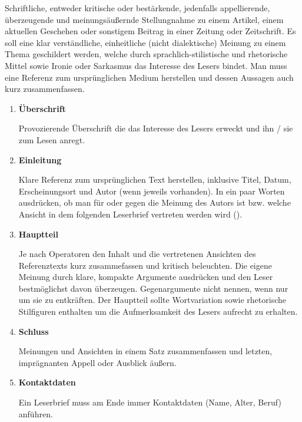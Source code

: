 



\thispagestyle{plain}




Schriftliche, entweder kritische oder best\"{a}rkende, jedenfalls appellierende, \"{u}berzeugende und meinungs\"{a}u\ss{}ernde Stellungnahme zu einem Artikel, einem aktuellen Geschehen oder sonstigem Beitrag in einer Zeitung oder Zeitschrift. Es soll eine klar verst\"{a}ndliche, einheitliche (nicht dialektische) Meinung zu einem Thema geschildert werden, welche durch sprachlich-stilistische und rhetorische Mittel sowie Ironie oder Sarkasmus das Interesse des Lesers bindet. Man muss eine Referenz zum urspr\"{u}nglichen Medium herstellen und dessen Aussagen auch kurz zusammenfassen.


\begin{enumerate}
  \item \textbf{\"{U}berschrift}
  \par
        Provozierende \"{U}berschrift die das Interesse des Lesers erweckt und ihn / sie zum Lesen anregt.

  \item \textbf{Einleitung}
  \par
  Klare Referenz zum urspr\"{u}nglichen Text herstellen, inklusive Titel, Datum, Erscheinungsort und Autor (wenn jeweils vorhanden). In ein paar Worten ausdr\"{u}cken, ob man f\"{u}r oder gegen die Meinung des Autors ist bzw. welche Ansicht in dem folgenden Leserbrief vertreten werden wird ().

  \item \textbf{Hauptteil}
  \par
  Je nach Operatoren den Inhalt und die vertretenen Ansichten des Referenztexts kurz zusammefassen und kritisch beleuchten. Die eigene Meinung durch klare, kompakte Argumente ausdr\"{u}cken und den Leser bestm\"{o}glichst davon \"{u}berzeugen. Gegenargumente nicht nennen, wenn nur um sie zu entkr\"{a}ften. Der Hauptteil sollte Wortvariation sowie rhetorische Stilfiguren enthalten um die Aufmerksamkeit des Lesers aufrecht zu erhalten.

  \item \textbf{Schluss}
  \par
  Meinungen und Ansichten in einem Satz zusammenfassen und letzten, impr\"{a}gnanten Appell oder Ausblick \"{a}u\ss{}ern.

  \item \textbf{Kontaktdaten}

  Ein Leserbrief muss am Ende immer Kontaktdaten (Name, Alter, Beruf) anf\"{u}hren.

\end{enumerate}

